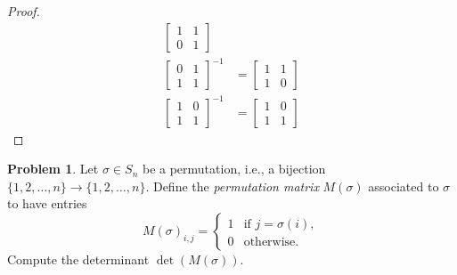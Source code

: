 \documentclass[12pt,reqno]{article}
\theoremstyle{definition}
\newtheorem{problem}{Problem}
\begin{document}
\begin{proof}
\begin{align*}
    \begin{bmatrix}
        1 & 1\\
        0 & 1
    \end{bmatrix}\\
    \begin{bmatrix}
        0 & 1\\
        1 & 1
    \end{bmatrix}^{-1} &= 
    \begin{bmatrix}
        1 & 1\\
        1 & 0
    \end{bmatrix}\\
    \begin{bmatrix}
        1 & 0\\
        1 & 1
    \end{bmatrix}^{-1} &=
    \begin{bmatrix}
        1 & 0\\
        1 & 1
    \end{bmatrix}
\end{align*}
\end{proof}

\newpage


\begin{problem}
Let $\sigma \in S_n$ be a permutation, i.e., a bijection $\{1,2,\ldots, n\} \rightarrow \{1,2,\ldots, n\}$. Define the \emph{permutation matrix} $M(\sigma)$ associated to $\sigma$ to have entries 
\begin{equation}
M(\sigma)_{i,j}=
    \begin{cases}
        1 & \text{if } j = \sigma(i),\\
        0 & \text{otherwise.}
    \end{cases}
\end{equation}
Compute the determinant $\det(M(\sigma))$.
\end{problem}
\end{document}
